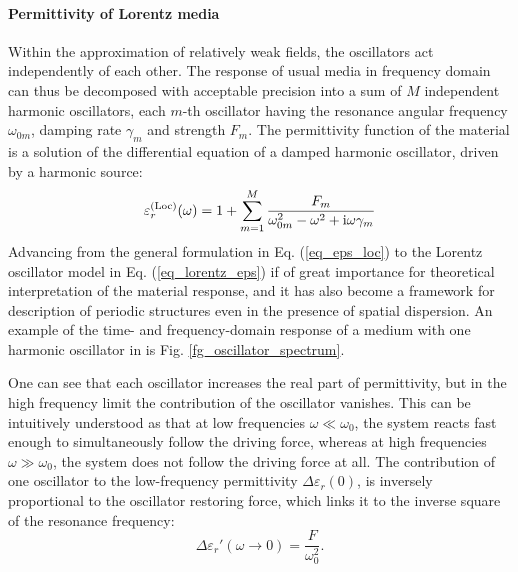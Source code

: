 \paragraph{Permittivity of Lorentz media} Within the approximation of relatively weak fields, the oscillators act independently of each other.
The response of usual media in frequency domain can thus be decomposed with acceptable precision into a sum of $M$ independent harmonic oscillators, each $m$-th oscillator having the resonance angular frequency $\omega_{0m}$, damping rate $\gamma_m$ and strength $F_m$.
The permittivity function of the material is a solution of the differential equation of a damped harmonic oscillator, driven by a harmonic source:
\begin{equation} \varepsilon^{\rm(Loc)}_r(\omega) = 1 + \sum_{m=1}^M \frac{F_m}{\omega_{0m}^2 - \omega^2 + {\mathrm i}\omega\gamma_m} \label{eq_lorentz_eps}\end{equation} %
Advancing from the general formulation in Eq. (\ref{eq_eps_loc}) to the Lorentz oscillator model in Eq. (\ref{eq_lorentz_eps}) if of great importance for theoretical interpretation of the material response, and it has also become a framework for description of periodic structures even in the presence of spatial dispersion. 
An example of the time- and frequency-domain response of a medium with one harmonic oscillator in is Fig. \ref{fg_oscillator_spectrum}.

One can see that each oscillator increases the real part of permittivity, but in the high frequency limit the contribution of the oscillator vanishes. This can be intuitively understood as that at low frequencies $\omega \ll \omega_0$, the system reacts fast enough to simultaneously follow the driving force, whereas at high frequencies  $\omega \gg \omega_0$, the system does not follow the driving force at all.
The contribution of one oscillator to the low-frequency permittivity $\Delta\varepsilon_r(0)$, is inversely proportional to the oscillator restoring force, which links it to the inverse square of the resonance frequency:
\begin{equation} \Delta \varepsilon_r'(\omega\rightarrow0) = \frac{F}{\omega_0^{2}}.  \label{eq_delta_eps} \end{equation}

